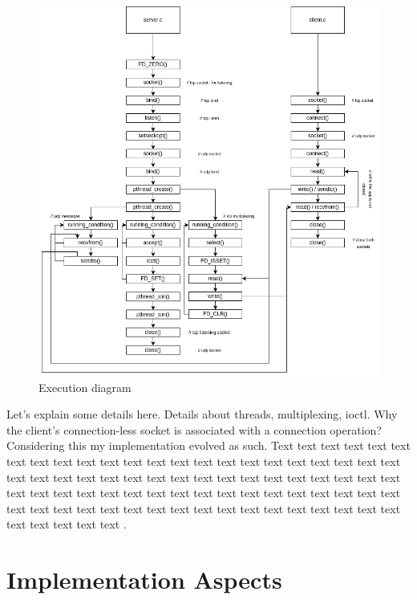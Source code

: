 \documentclass[runningheads]{llncs}
\begin{document}
\begin{figure}[!ht]
    \includegraphics[width=\textwidth]{RR execution diagram.drawio.png}
    \caption{Execution diagram} \label{fig1}
\end{figure}

Let's explain some details here. Details about threads, multiplexing, ioctl. Why the client's connection-less socket is associated with a connection operation? Considering this \cite{udp-connect} my implementation evolved as such. Text text text text text text text text text text text text text text text text text text text text text text text text text text text text text text text text text text text text text text text text text text text text text text text text text text text text text text text text text text text text text text text text text text text text text text text text text text text text text text text .


\section{Implementation Aspects}
\end{document}
